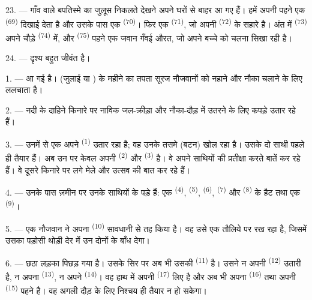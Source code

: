 23. --- गाँव वाले बपतिस्मे का जुलूस निकलते देखने अपने घरों से बाहर आ गए हैं।
हमें अपनी  पहने एक  \textsuperscript{(69)}
दिखाई देता है और उसके पास एक  \textsuperscript{(70)}। फिर एक 
\textsuperscript{(71)}, जो अपनी  \textsuperscript{(72)} के सहारे
है। अंत में  \textsuperscript{(73)} अपने चौड़े
 \textsuperscript{(74)} में, और
 \textsuperscript{(75)} पहने एक जवान गँवई औरत, जो अपने बच्चे को
चलना सिखा रही है।

24. --- दृश्य बहुत जीवंत है।
\VUsaut{4.0mm}

\VUsaut{3.0mm}

\VUsaut{2.4mm}

\VUsaut{3.0mm}

1. ---  आ गई है।  (जुलाई या ) के महीने
का तपता सूरज नौजवानों को नहाने और नौका चलाने के लिए ललचाता है।

2. --- नदी के दाहिने किनारे पर नाविक जल-क्रीड़ा और नौका-दौड़ में उतरने के लिए
कपड़े उतार रहे हैं।

3. --- उनमें से एक अपने  \textsuperscript{(1)} उतार रहा है; वह उनके
तसमे (बटन) खोल रहा है। उसके दो साथी पहले ही तैयार हैं। अब उन पर केवल अपनी
 \textsuperscript{(2)} और 
\textsuperscript{(3)} है। वे अपने साथियों की प्रतीक्षा करते बातें कर रहे हैं। वे
दूसरे किनारे पर लगे मेले और उत्सव की बात कर रहे हैं।

4. --- उनके पास ज़मीन पर उनके साथियों के  पड़े हैं: एक
  \textsuperscript{(4)}, 
\textsuperscript{(5)},  \textsuperscript{(6)}, 
\textsuperscript{(7)} और  \textsuperscript{(8)} के हैट तथा एक
 \textsuperscript{(9)}।

5. --- एक नौजवान ने अपना  \textsuperscript{(10)} सावधानी से तह किया
है। वह उसे एक तौलिये पर रख रहा है, जिसमें उसका पड़ोसी थोड़ी देर में उन दोनों के
 बाँध देगा।

6. --- छठा लड़का पिछड़ गया है। उसके सिर पर अब भी उसकी 
\textsuperscript{(11)} है। उसने न अपनी  \textsuperscript{(12)} उतारी
है, न अपना  \textsuperscript{(13)}, न अपने 
\textsuperscript{(14)}। वह हाथ में अपनी  \textsuperscript{(17)} लिए
है और अब भी अपना  \textsuperscript{(16)} तथा अपनी
 \textsuperscript{(15)} पहने है। वह अगली दौड़ के लिए निश्चय ही
तैयार न हो सकेगा।

